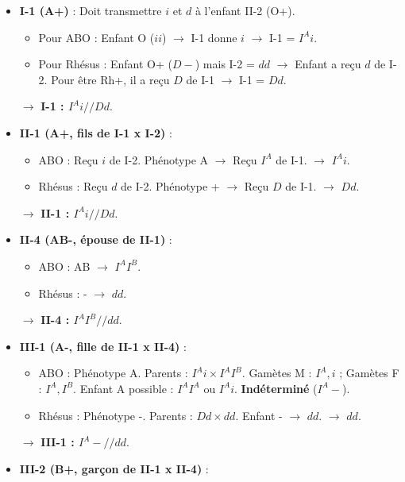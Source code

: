 \documentclass[11pt]{article}
\begin{document}
\begin{exoresolu}
\begin{enumerate}
\begin{itemize}
        \item \textbf{I-1 (A+)} : Doit transmettre $i$ et $d$ à l'enfant II-2 (O+).
            \begin{itemize}
                \item Pour ABO : Enfant O ($ii$) $\rightarrow$ I-1 donne $i$ $\rightarrow$ I-1 = \textbf{$I^A i$}.
                \item Pour Rhésus : Enfant O+ ($D-$) mais I-2 = $dd$ $\rightarrow$ Enfant a reçu $d$ de I-2. Pour être Rh+, il a reçu $D$ de I-1 $\rightarrow$ I-1 = \textbf{$Dd$}.
            \end{itemize}
            $\rightarrow$ \textbf{I-1 : $I^A i // Dd$}.
        \item \textbf{II-1 (A+, fils de I-1 x I-2)} : 
            \begin{itemize}
                \item ABO : Reçu $i$ de I-2. Phénotype A $\rightarrow$ Reçu $I^A$ de I-1. $\rightarrow$ \textbf{$I^A i$}.
                \item Rhésus : Reçu $d$ de I-2. Phénotype + $\rightarrow$ Reçu $D$ de I-1. $\rightarrow$ \textbf{$Dd$}.
            \end{itemize}
            $\rightarrow$ \textbf{II-1 : $I^A i // Dd$}.
        \item \textbf{II-4 (AB-, épouse de II-1)} : 
            \begin{itemize}
                \item ABO : AB $\rightarrow$ \textbf{$I^A I^B$}.
                \item Rhésus : - $\rightarrow$ \textbf{$dd$}.
            \end{itemize}
            $\rightarrow$ \textbf{II-4 : $I^A I^B // dd$}.
        \item \textbf{III-1 (A-, fille de II-1 x II-4)} :
            \begin{itemize}
                \item ABO : Phénotype A. Parents : $I^A i \times I^A I^B$. Gamètes M : $I^A, i$ ; Gamètes F : $I^A, I^B$. Enfant A possible : $I^A I^A$ ou $I^A i$. \textbf{Indéterminé} ($I^A-$).
                \item Rhésus : Phénotype -. Parents : $Dd \times dd$. Enfant - $\rightarrow$ $dd$. $\rightarrow$ \textbf{$dd$}.
            \end{itemize}
            $\rightarrow$ \textbf{III-1 : $I^A- // dd$}.
        \item \textbf{III-2 (B+, garçon de II-1 x II-4)} :
            \begin{itemize}

\end{itemize}
\end{itemize}
\end{enumerate}
\end{exoresolu}
\end{document}
